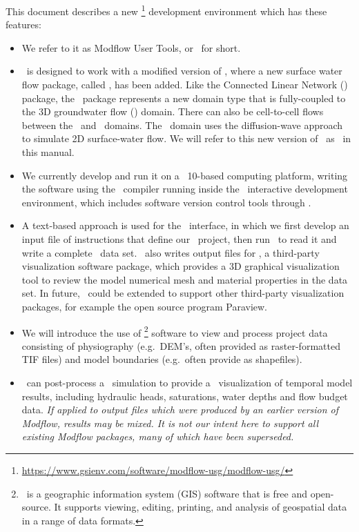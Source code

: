 \label{chapter:Introduction} This document describes a new \mfu\footnote{\url{https://www.gsienv.com/software/modflow-usg/modflow-usg/}}  development environment which has these features:
\begin{itemize}
    \item We refer to it as Modflow User Tools, or \mut\ for short.
    \item \mut\ is designed to work with a modified version of \mfu,  where a new surface water flow package, called \swf, has been added. Like the Connected Linear Network (\cln) package, the \swf\ package represents a new domain type that is fully-coupled to the 3D groundwater flow (\gwf) domain. There can also be cell-to-cell flows between the \swf\ and \cln\ domains.  The \swf\ domain uses the diffusion-wave approach to simulate 2D surface-water flow. We will refer to this new version of \mfu\ as \mfus\ in this manual.
    \item We currently develop and run it on a \windows\ 10-based computing platform, writing the software using the \ifort\ compiler running inside the \vstudio\ interactive development environment, which includes software version control tools through \github.
    \item A text-based approach is used for the \mut\ interface, in which we first develop an input file of instructions that define our \mfus\ project,  then run \mut\ to read it and write a complete \mfus\ data set. \mut\ also writes output files for \tecplot, a third-party visualization software package, which provides a 3D graphical visualization tool to review the model numerical mesh and material properties in the data set. In future, \mut\ could be extended to support other third-party visualization packages, for example the open source program Paraview.
    \item We will introduce the use of \qgis\footnote{\qgis\ is a geographic information system (GIS) software that is free and open-source. It supports viewing, editing, printing, and analysis of geospatial data in a range of data formats.} software to view and process project data consisting of physiography (e.g.\ DEM's, often provided as raster-formatted TIF files) and model boundaries (e.g.\ often provide as shapefiles).
    \item \mut\ can post-process a \mfus\ simulation to provide a \tecplot\ visualization of temporal model results, including hydraulic heads, saturations, water depths and flow budget data.  \textit{If applied to output files which were produced by an earlier version of Modflow, results may be mixed.  It is not our intent here to support all existing Modflow packages, many of which have been superseded.}
\end{itemize}

